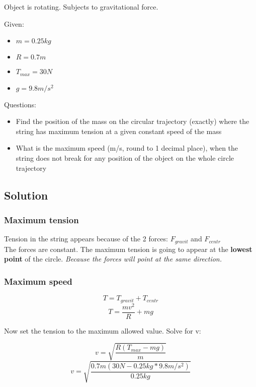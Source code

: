 
Object is rotating. Subjects to gravitational force.


\bigbreak Given: 
\begin{itemize}
    \item $  m  = 0.25kg $
    \item $ R = 0.7m $
    \item $ T_{max} = 30N $
    \item $ g = 9.8m/s^2 $
\end{itemize}


\bigbreak Questions:
\begin{itemize}
    \item Find the position of the mass on the circular trajectory (exactly) where the string has
    maximum tension at a given constant speed of the mass
    \item What is the maximum speed (m/s, round to 1 decimal place), when the string does not
    break for any position of the object on the whole circle trajectory
\end{itemize}

\subsection*{Solution}
\subsubsection*{Maximum tension}
Tension in the string appears because of the 2 forces: $F_{gravit}$ and $F_{centr}$ \\
The forces are constant. The maximum tension is going to appear at the \textbf{lowest point} of the circle.
\textit{Because the forces will point at the same direction.}


\subsubsection*{Maximum speed}
$$ T = T_{gravit} + T_{centr} $$
$$ T = \frac{mv^2}{R} + mg $$

Now set the tension to the maximum allowed value. Solve for v:

$$  v =  \sqrt{\frac{R(T_{max} - mg)}{m}} $$
$$  v =  \sqrt{\frac{0.7m(30N - 0.25kg * 9.8m/s^2)}{0.25kg}} $$


